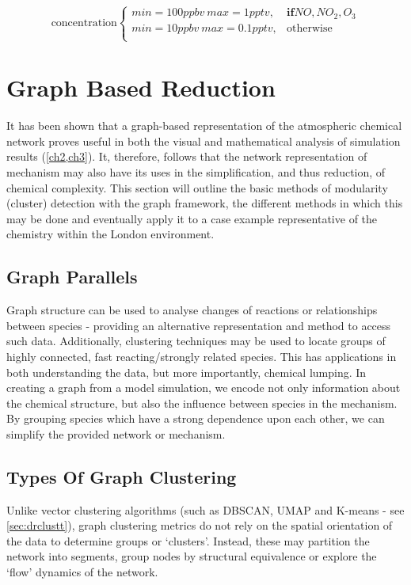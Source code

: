 \begin{equation}
\text{concentration}
    \begin{cases}
      min = 100ppbv \ max=1pptv , & \mathbf{if} NO,NO_2,O_3\\
      min = 10ppbv \ max=0.1pptv , & \text{otherwise}\\
    \end{cases}
\label{eqn:icslhs}
  \end{equation}
\section{Graph Based Reduction}\label{sec:graphreduction}
It has been shown that a graph-based representation of the atmospheric chemical network proves useful in both the visual and mathematical analysis of simulation results (\autoref{ch2,ch3}). It, therefore, follows that the network representation of mechanism may also have its uses in the simplification, and thus reduction, of chemical complexity.  This section will outline the basic methods of modularity (cluster) detection with the graph framework, the different methods in which this may be done and eventually apply it to a case example representative of the chemistry within the London environment.




\subsection{Graph Parallels}

Graph structure can be used to analyse changes of reactions or relationships between species - providing an alternative representation and method to access such data. Additionally, clustering techniques may be used to locate groups of highly connected, fast reacting/strongly related species. This has applications in both understanding the data, but more importantly, chemical lumping. In creating a graph from a model simulation, we encode not only information about the chemical structure, but also the influence between species in the mechanism. By grouping species which have a strong dependence upon each other, we can simplify the provided network or mechanism.

 \subsection{Types Of Graph Clustering}
Unlike vector clustering algorithms (such as DBSCAN, UMAP and K-means - see \autoref{sec:drclustt}), graph clustering metrics do not rely on the spatial orientation of the data to determine groups or `clusters'. Instead, these may partition the network into segments, group nodes by structural equivalence or explore the `flow' dynamics of the network.

